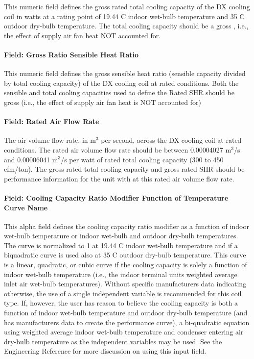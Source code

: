 This numeric field defines the gross rated total cooling capacity of the DX cooling coil in watts at a rating point of 19.44 C indoor wet-bulb temperature and 35 C outdoor dry-bulb temperature. The total cooling capacity should be a gross , i.e., the effect of supply air fan heat NOT accounted for.

\paragraph{Field: Gross Ratio Sensible Heat Ratio}\label{field-gross-ratio-sensible-heat-ratio}

This numeric field defines the gross sensible heat ratio (sensible capacity divided by total cooling capacity) of the DX cooling coil at rated conditions. Both the sensible and total cooling capacities used to define the Rated SHR should be gross (i.e., the effect of supply air fan heat is NOT accounted for)

\paragraph{Field: Rated Air Flow Rate}\label{field-rated-air-flow-rate}

The air volume flow rate, in m\(^{3}\) per second, across the DX cooling coil at rated conditions. The rated air volume flow rate should be between 0.00004027 m\(^{3}\)/s and 0.00006041 m\(^{3}\)/s per watt of rated total cooling capacity (300 to 450 cfm/ton). The gross rated total cooling capacity and gross rated SHR should be performance information for the unit with at this rated air volume flow rate.

\paragraph{Field: Cooling Capacity Ratio Modifier Function of Temperature Curve Name}\label{field-cooling-capacity-ratio-modifier-function-of-temperature-curve-name}

This alpha field defines the cooling capacity ratio modifier as a function of indoor wet-bulb temperature or indoor wet-bulb and outdoor dry-bulb temperatures. The curve is normalized to 1 at 19.44 C indoor wet-bulb temperature and if a biquadratic curve is used also at 35 C outdoor dry-bulb temperature. This curve is a linear, quadratic, or cubic curve if the cooling capacity is solely a function of indoor wet-bulb temperature (i.e., the indoor terminal units weighted average inlet air wet-bulb temperatures). Without specific manufacturers data indicating otherwise, the use of a single independent variable is recommended for this coil type. If, however, the user has reason to believe the cooling capacity is both a function of indoor wet-bulb temperature and outdoor dry-bulb temperature (and has manufacturers data to create the performance curve), a bi-quadratic equation using weighted average indoor wet-bulb temperature and condenser entering air dry-bulb temperature as the independent variables may be used. See the Engineering Reference for more discussion on using this input field.

